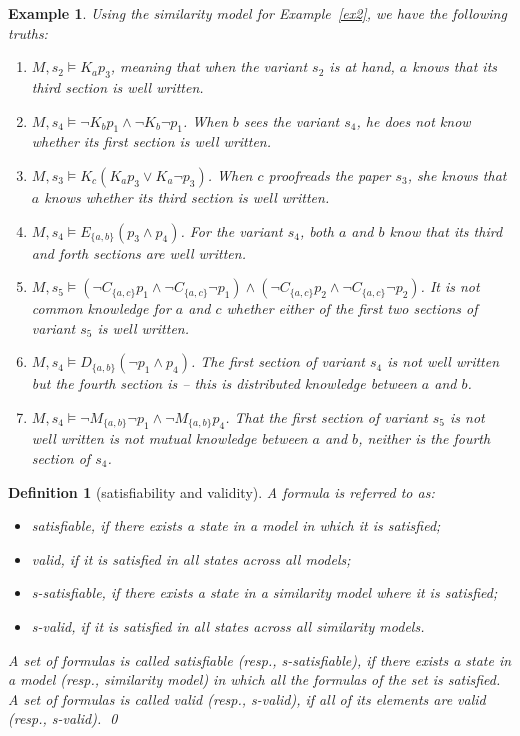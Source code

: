 \documentclass{article}
\newtheorem{definition}[theorem]{Definition}%
\newtheorem{example}[theorem]{Example}%
\begin{document}
\begin{example}
Using the similarity model for Example~\ref{ex2}, we have the following truths:
\begin{enumerate}
\item $M,s_2 \models K_a p_3$, meaning that when the variant $s_2$ is at hand, $a$ knows that its third section is well written.
%
\item $M,s_4 \models \neg K_b p_1 \wedge \neg K_b \neg p_1$. When $b$ sees the variant $s_4$, he does not know whether its first section is well written.
%
\item $M,s_3 \models K_c (K_a p_3 \vee K_a \neg p_3)$. When $c$ proofreads the paper $s_3$, she knows that $a$ knows whether its third section is well written.
%
\item $M,s_4 \models E_{\{a,b\}} (p_3 \wedge p_4)$. For the variant $s_4$, both $a$ and $b$ know that its third and forth sections are well written.
%
\item $M,s_5 \models (\neg C_{\{a,c\}} p_1 \wedge \neg C_{\{a,c\}} \neg p_1) \wedge (\neg C_{\{a,c\}} p_2 \wedge \neg C_{\{a,c\}} \neg p_2)$. It is not common knowledge for $a$ and $c$ whether either of the first two sections of variant $s_5$ is well written.
%
\item $M,s_4 \models D_{\{a,b\}} (\neg p_1 \wedge p_4)$. The first section of variant $s_4$ is not well written but the fourth section is -- this is distributed knowledge between $a$ and $b$.
%
\item $M,s_4 \models \neg M_{\{a,b\}} \neg p_1 \wedge \neg M_{\{a,b\}} p_4$. That the first section of variant $s_5$ is not well written is not mutual knowledge between $a$ and $b$, neither is the fourth section of $s_4$.
\end{enumerate}
\end{example}


\begin{definition}[satisfiability and validity]
A formula is referred to as:
\begin{itemize}
\item \emph{satisfiable}, if there exists a state in a model in which it is satisfied;
\item \emph{valid}, if it is satisfied in all states across all models;
\item \emph{s-satisfiable}, if there exists a state in a similarity model where it is satisfied;
\item \emph{s-valid}, if it is satisfied in all states across all similarity models.
\end{itemize}
A set of formulas is called \emph{satisfiable} (resp., \emph{s-satisfiable}), if there exists a state in a model (resp., \emph{similarity model}) in which all the formulas of the set is satisfied. A set of formulas is called \emph{valid} (resp., \emph{s-valid}), if all of its elements are valid (resp., s-valid).
\qed
\end{definition}
\end{document}
